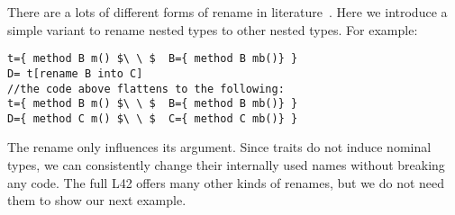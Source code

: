


There are a lots of different forms of rename in
literature~\cite{deep,ancona_zucca_2002,bracha1992programming}.
Here we introduce a simple variant to rename nested types to other nested types.
For example:
\begin{lstlisting}
t={ method B m() $\ \ $  B={ method B mb()} }
D= t[rename B into C]
//the code above flattens to the following:
t={ method B m() $\ \ $  B={ method B mb()} }
D={ method C m() $\ \ $  C={ method C mb()} }
\end{lstlisting}
The rename only influences its argument.
Since traits do not induce nominal types, we can
consistently change their
internally used names without breaking any code.
The full L42 offers many other kinds of renames, but we do not need them to show our next example.

